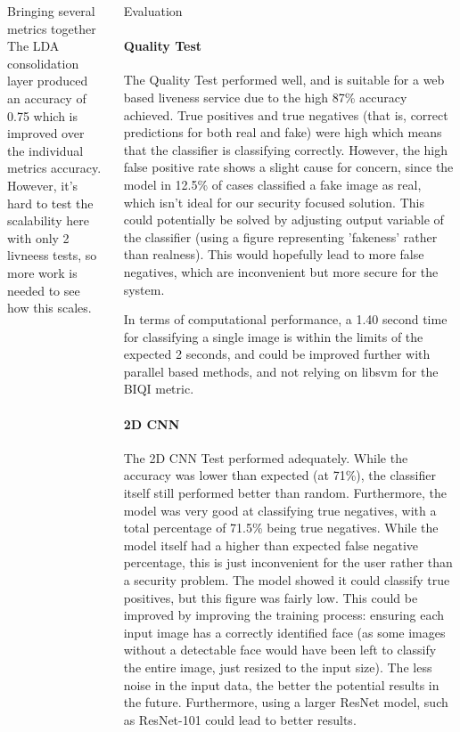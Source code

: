 \documentclass[final]{beamer}
\begin{document}
\begin{frame}{}
\begin{columns}[t]
\begin{column}{.48\linewidth}
\begin{block}{Bringing several metrics together}
          The LDA consolidation layer produced an accuracy of 0.75 which is improved over the individual metrics accuracy. However, it's hard to test the scalability here with only 2 livneess tests, so more work is needed to
          see how this scales.
        \end{block}

      \end{column}


      \begin{column}{.48\linewidth}

        \begin{block}{Evaluation}
          \paragraph{Quality Test}
          The Quality Test performed well, and is suitable for a web based liveness service due to the high 87\% accuracy achieved.
          True positives and true negatives (that is, correct predictions for both real and fake) were high which means that the classifier
          is classifying correctly. However, the high false positive rate shows a slight cause for concern, since the model in 12.5\% of cases
          classified a fake image as real, which isn't ideal for our security focused solution. This could potentially be solved by adjusting output
          variable of the classifier (using a figure representing 'fakeness' rather than realness). This would hopefully lead to more false negatives,
          which are inconvenient but more secure for the system.

          In terms of computational performance, a 1.40 second time for classifying a single image is within the limits of the expected 2 seconds, and could be improved further
          with parallel based methods, and not relying on libsvm for the BIQI metric.
      \paragraph{2D CNN}
          The 2D CNN Test performed adequately. While the accuracy was lower than expected (at 71\%), the classifier itself still performed better than random.
          Furthermore, the model was very good at classifying true negatives, with a total percentage of 71.5\% being true negatives. While the model itself had
          a higher than expected false negative percentage, this is just inconvenient for the user rather than a security problem. The model showed it could classify true
          positives, but this figure was fairly low. This could be improved by improving the training process: ensuring each input image has a correctly identified face (as
          some images without a detectable face would have been left to classify the entire image, just resized to the input size). The less noise in the input data, the better the potential
          results in the future. Furthermore, using a larger ResNet model, such as ResNet-101 could lead to better results.


\end{block}
\end{column}
\end{columns}
\end{frame}
\end{document}
